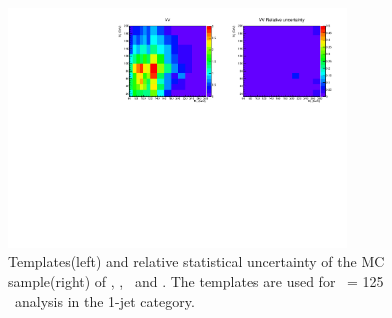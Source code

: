 \begin{figure}[htp]
\includegraphics[width=0.8\textwidth]{figures/2dtemplate_VV_mH125_1j.pdf}
\caption{Templates(left) and relative statistical uncertainty of the MC sample(right) 
of \qqww, \ggww, \topbkg\ and \vv. 
The templates are used for \mHi\ = 125 \GeV\ analysis in the 1-jet category.}
\label{fig:2dtemplate_125_1j_2}
\end{figure}

